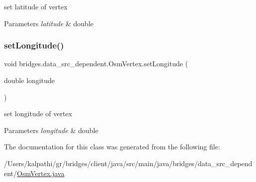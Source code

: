 set latitude of vertex 
\begin{DoxyParams}{Parameters}
{\em latitude} & double \\
\hline
\end{DoxyParams}
\mbox{\label{classbridges_1_1data__src__dependent_1_1_osm_vertex_a2b4ac472641b5b206cff7db53ce3285b}} 
\subsubsection{\texorpdfstring{set\+Longitude()}{setLongitude()}}
{\footnotesize\ttfamily void bridges.\+data\+\_\+src\+\_\+dependent.\+Osm\+Vertex.\+set\+Longitude (\begin{DoxyParamCaption}\item[{double}]{longitude }\end{DoxyParamCaption})}

set longitude of vertex 
\begin{DoxyParams}{Parameters}
{\em longitude} & double \\
\hline
\end{DoxyParams}


The documentation for this class was generated from the following file\+:\begin{DoxyCompactItemize}
\item 
/\+Users/kalpathi/gr/bridges/client/java/src/main/java/bridges/data\+\_\+src\+\_\+dependent/\mbox{\hyperlink{_osm_vertex_8java}{Osm\+Vertex.\+java}}\end{DoxyCompactItemize}
